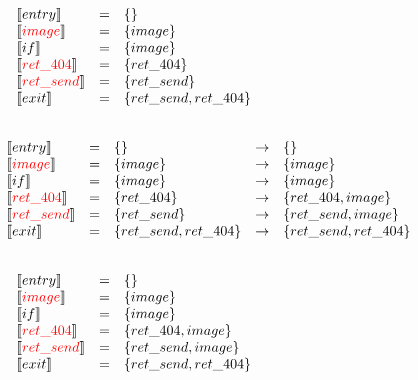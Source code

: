 \begin{frame}
\[
\begin{array}{lclcl}
  \constraint{entry} & = & \{\} &&\\
  \assignconstraint{image} & = & \{image\} &&\\
  \constraint{if} & = & \{image\} &&\\
  \assignconstraint{ret\_404} & = & \{ret\_404\} &&\\
  \assignconstraint{ret\_send} & = & \{ret\_send\} &&\\
  \constraint{exit} & = & \{ret\_send, ret\_404\} &&\\
  && \phantom{\{command, param\}} && \phantom{\{command, param\}}
\end{array}
\]
\end{frame}

\begin{frame}
\[
\begin{array}{lclcl}
  \constraint{entry} & = & \{\} & \rightarrow & \{\}\\
  \assignconstraint{image} & = & \{image\} & \rightarrow &\{image\}\\
  \constraint{if} & = & \{image\} & \rightarrow &\{image\}\\
  \assignconstraint{ret\_404} & = & \{ret\_404\} & \rightarrow &\{ret\_404, image\}\\
  \assignconstraint{ret\_send} & = & \{ret\_send\} & \rightarrow &\{ret\_send, image\}\\
  \constraint{exit} & = & \{ret\_send, ret\_404\} & \rightarrow & \{ret\_send, ret\_404\}\\
  && \phantom{\{command, param\}} && \phantom{\{command, param\}}
\end{array}
\]
\end{frame}


\begin{frame}
\[
\begin{array}{lclcl}
  \constraint{entry} & = & \{\} &&\\
  \assignconstraint{image} & = & \{image\} &&\\
  \constraint{if} & = & \{image\} &&\\
  \assignconstraint{ret\_404} & = & \{ret\_404, image\} &&\\
  \assignconstraint{ret\_send} & = & \{ret\_send, image\} &&\\
  \constraint{exit} & = & \{ret\_send, ret\_404\} &&\\
  && \phantom{\{command, param\}} && \phantom{\{command, param\}}
\end{array}
\]
\end{frame}

